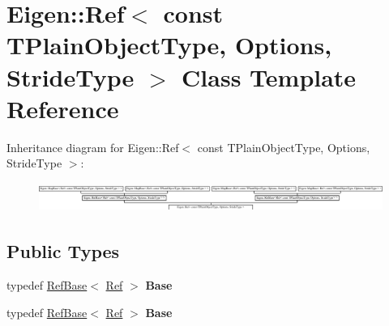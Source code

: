 \hypertarget{class_eigen_1_1_ref_3_01const_01_t_plain_object_type_00_01_options_00_01_stride_type_01_4}{}\section{Eigen\+:\+:Ref$<$ const T\+Plain\+Object\+Type, Options, Stride\+Type $>$ Class Template Reference}
\label{class_eigen_1_1_ref_3_01const_01_t_plain_object_type_00_01_options_00_01_stride_type_01_4}
Inheritance diagram for Eigen\+:\+:Ref$<$ const T\+Plain\+Object\+Type, Options, Stride\+Type $>$\+:\begin{figure}[H]
\begin{center}
\leavevmode
\includegraphics[height=0.965517cm]{class_eigen_1_1_ref_3_01const_01_t_plain_object_type_00_01_options_00_01_stride_type_01_4}
\end{center}
\end{figure}
\subsection*{Public Types}
\begin{DoxyCompactItemize}
\item 
\mbox{\label{class_eigen_1_1_ref_3_01const_01_t_plain_object_type_00_01_options_00_01_stride_type_01_4_a761b257d77371a3cfbdacda03211fd91}} 
typedef \hyperlink{class_eigen_1_1_ref_base}{Ref\+Base}$<$ \hyperlink{group___core___module_class_eigen_1_1_ref}{Ref} $>$ {\bfseries Base}
\item 
\mbox{\label{class_eigen_1_1_ref_3_01const_01_t_plain_object_type_00_01_options_00_01_stride_type_01_4_a761b257d77371a3cfbdacda03211fd91}} 
typedef \hyperlink{class_eigen_1_1_ref_base}{Ref\+Base}$<$ \hyperlink{group___core___module_class_eigen_1_1_ref}{Ref} $>$ {\bfseries Base}
\end{DoxyCompactItemize}
